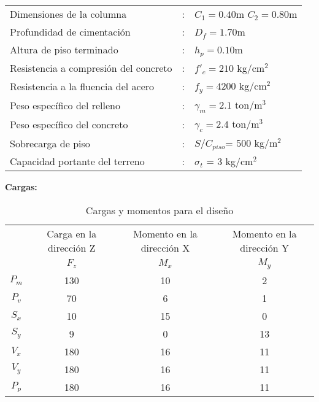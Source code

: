 \begin{table}[h!]
    \centering
    \begin{tabular}{lcl} %
        Dimensiones de la columna               &:& $C_1        = 0.40$m \quad $C_2 = 0.80$m\\
        Profundidad de cimentación              &:& $D_f        = 1.70$m\\
        Altura de piso terminado                &:& $h_p        = 0.10$m\\
        Resistencia a compresión del concreto   &:& $f'_c       = 210$ kg/cm$^2$ \\
        Resistencia a la fluencia del acero     &:& $f_y        = 4200$ kg/cm$^2$ \\
        Peso específico del relleno             &:& $\gamma_m   = 2.1$ ton/m$^3$ \\
        Peso específico del concreto            &:& $\gamma_c   = 2.4$ ton/m$^3$ \\
        Sobrecarga de piso                      &:& $S/C_{piso}$= 500 kg/m$^2$ \\ 
        Capacidad portante del terreno          &:& $\sigma_t$  = 3 kg/cm$^2$  \\ %
    \end{tabular}
\end{table}

\textbf{Cargas:}


\begin{table}[h!]
    \centering
    \begin{tabular}{cccc} \toprule
         & Carga en la dirección Z & Momento en la dirección X & Momento en la dirección Y  \\ 
         & $F_z$ & $M_x $ & $M_y$ \\ \midrule
        $P_m$ & 130& 10 & 2 \\
        $P_v$ & 70 & 6 & 1 \\
        $S_x$ & 10 & 15 & 0 \\
        $S_y$ & 9 & 0 & 13 \\
        $V_x$ & 180 & 16 & 11 \\
        $V_y$ & 180 & 16 & 11 \\
        $P_p$ & 180 & 16 & 11 \\\bottomrule
    \end{tabular}
    \caption{Cargas y momentos para el diseño}
    \label{tab:my_label}
\end{table}

